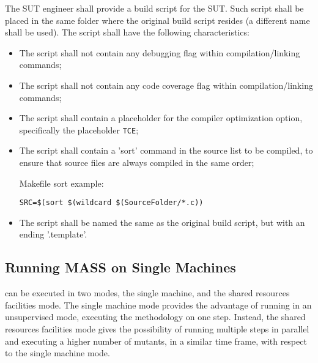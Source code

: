 The SUT engineer shall provide a build script for the SUT. Such script shall be placed in the same folder where the original build script resides (a different name shall be used). The script shall have the following characteristics:

\begin{itemize}
	\item The script shall not contain any debugging flag within compilation/linking commands;
	\item The script shall not contain any code coverage flag within compilation/linking commands;
	\item The script shall contain a placeholder for the compiler optimization option, specifically the placeholder \texttt{TCE};
	\item The script shall contain a 'sort' command in the source list to be compiled, to ensure that source files are always compiled in the same order; 
	
	Makefile sort example:

	\texttt{SRC=\$(sort \$(wildcard \$(SourceFolder/*.c))}

	\item The script shall be named the same as the original build script, but with an ending '.template'.
\end{itemize}


\subsection{Running MASS on Single Machines}
\label{sec:singlelaunch}


\MASS can be executed in two modes, the single machine, and the shared resources facilities mode. The single machine mode provides the advantage of running \MASS in an unsupervised mode, executing the methodology on one step. Instead, the shared resources facilities mode gives the possibility of running multiple steps in parallel and executing a higher number of mutants, in a similar time frame, with respect to the single machine mode.


